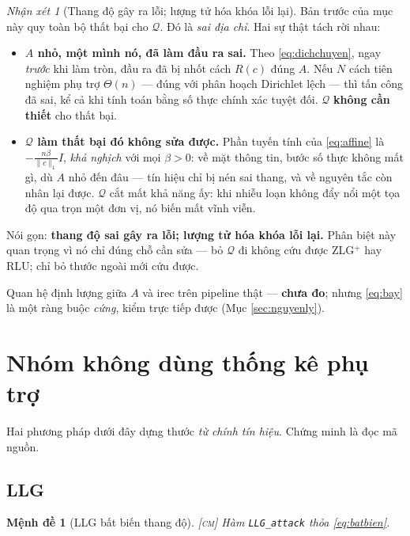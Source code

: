 \documentclass[11pt,a4paper]{article}
\newtheorem{menhde}[dinhly]{Mệnh đề}
\theoremstyle{remark}
\newtheorem{nhanxet}[dinhly]{Nhận xét}
\newcommand{\quant}{\mathcal{Q}}
\newcommand{\code}[1]{\texttt{\small #1}}
\begin{document}
\begin{nhanxet}[Thang độ gây ra lỗi; lượng tử hóa khóa lỗi lại]
\label{nx:luongtu}
Bản trước của mục này quy toàn bộ thất bại cho $\quant$. Đó là \emph{sai địa
chỉ}. Hai sự thật tách rời nhau:

\begin{itemize}
\item \textbf{$A$ nhỏ, một mình nó, đã làm đầu ra sai.} Theo
  \eqref{eq:dichchuyen}, ngay \emph{trước} khi làm tròn, đầu ra đã bị nhốt
  cách $R(c)$ đúng $A$. Nếu $N$ cách tiên nghiệm phụ trợ $\Theta(n)$ --- đúng
  với phân hoạch Dirichlet lệch --- thì tấn công đã sai, kể cả khi tính toán
  bằng số thực chính xác tuyệt đối. $\quant$ \textbf{không cần thiết} cho
  thất bại.
\item \textbf{$\quant$ làm thất bại đó không sửa được.} Phần tuyến tính của
  \eqref{eq:affine} là $-\tfrac{n\beta}{\|c\|_1}I$, \emph{khả nghịch} với mọi
  $\beta>0$: về mặt thông tin, bước số thực không mất gì, dù $A$ nhỏ đến đâu
  --- tín hiệu chỉ bị nén sai thang, và về nguyên tắc còn nhân lại được.
  $\quant$ cắt mất khả năng ấy: khi nhiễu loạn không đẩy nổi một tọa độ qua
  trọn một đơn vị, nó biến mất vĩnh viễn.
\end{itemize}

Nói gọn: \textbf{thang độ sai gây ra lỗi; lượng tử hóa khóa lỗi lại.} Phân
biệt này quan trọng vì nó chỉ đúng chỗ cần sửa --- bỏ $\quant$ đi không cứu
được ZLG$^+$ hay RLU; chỉ bỏ thước ngoài mới cứu được.

Quan hệ định lượng giữa $A$ và irec trên pipeline thật --- \textbf{chưa đo};
nhưng \eqref{eq:bay} là một ràng buộc \emph{cứng}, kiểm trực tiếp được (Mục
\ref{sec:nguyenly}).
\end{nhanxet}

\section{Nhóm không dùng thống kê phụ trợ}
\label{sec:noaux}

Hai phương pháp dưới đây dựng thước \emph{từ chính tín hiệu}. Chứng minh là
đọc mã nguồn.

\subsection{LLG}

\begin{menhde}[LLG bất biến thang độ]
\label{md:llg}
\textsc{[cm]}\; Hàm \code{LLG\_attack} thỏa \eqref{eq:batbien}.
\end{menhde}
\end{document}
